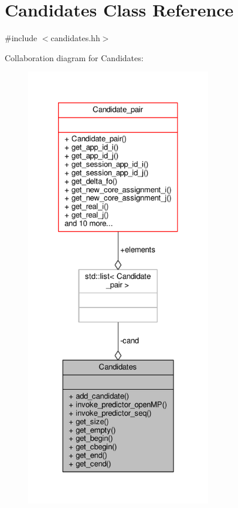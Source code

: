 \hypertarget{classCandidates}{\section{Candidates Class Reference}
\label{classCandidates}
}


{\ttfamily \#include $<$candidates.\-hh$>$}



Collaboration diagram for Candidates\-:
\nopagebreak
\begin{figure}[H]
\begin{center}
\leavevmode
\includegraphics[height=550pt]{classCandidates__coll__graph}
\end{center}
\end{figure}
